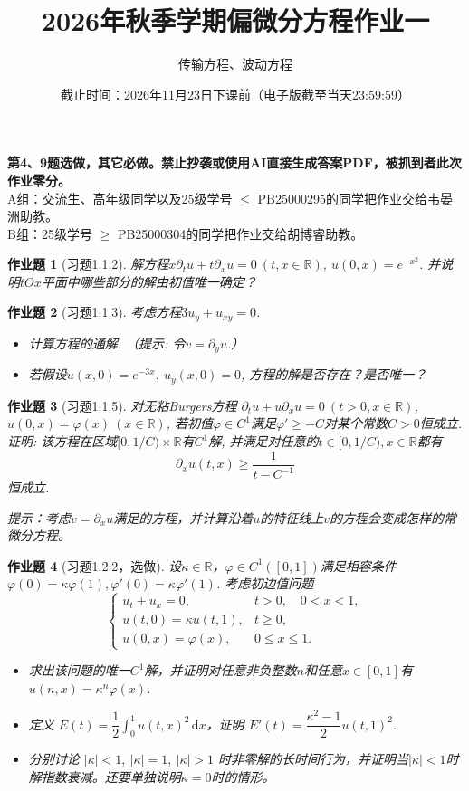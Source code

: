 \documentclass[UTF8,fontset=windows,12pt]{ctexart}
\theoremstyle{kaiti-theorem}
\newtheorem{problem}{作业题}
\numberwithin{equation}{section}
\newcommand{\R}{\mathbb{R}}
\newcommand{\vp}{\varphi}
\newcommand{\p}{\partial}
\newcommand{\dx}{\,\mathrm{d}x}
\newcommand{\kk}{\kappa}
\begin{document}
\title{\LARGE{\bf  2026年秋季学期偏微分方程作业一}}
\author{传输方程、波动方程}
\date{截止时间：2026年11月23日下课前（电子版截至当天23:59:59）}

\maketitle

\textbf{第4、9题选做，其它必做。禁止抄袭或使用AI直接生成答案PDF，被抓到者此次作业零分。}\\
A组：交流生、高年级同学以及25级学号 $\leqslant$ PB25000295的同学把作业交给韦晏洲助教。\\
B组：25级学号 $\geqslant$ PB25000304的同学把作业交给胡博睿助教。

\begin{problem}[习题1.1.2]
解方程$x\p_t u+t\p_x u=0~(t,x\in\R),~u(0,x)=e^{-x^2}$. 并说明$tOx$平面中哪些部分的解由初值唯一确定？
\end{problem}

\begin{problem}[习题1.1.3]
考虑方程$3u_y+u_{xy}=0$.
\begin{itemize}
\item [(1)] 计算方程的通解. （提示: 令$v=\p_y u$.）
\item [(2)] 若假设$u(x,0)=e^{-3x},~u_y(x,0)=0$, 方程的解是否存在？是否唯一？
\end{itemize}
\end{problem}

\begin{problem}[习题1.1.5]
对无粘Burgers方程 $\p_t u+u\p_x u=0~(t>0,x\in\R)$, $u(0,x)=\vp(x)~(x\in\R)$, 若初值$\vp\in C^1$满足$\vp'\geqslant -C$对某个常数$C>0$恒成立. 证明: 该方程在区域$[0,1/C)\times \R$有$C^1$解, 并满足对任意的$t\in[0,1/C),x\in\R$都有$$\p_x u(t,x)\geqslant \frac{1}{t-C^{-1}}$$恒成立. 

提示：考虑$v=\p_x u$满足的方程，并计算沿着$u$的特征线上$v$的方程会变成怎样的常微分方程。
\end{problem}

\begin{problem}[习题1.2.2，选做]
设$\kk\in\R$，$\vp\in C^1([0,1])$满足相容条件 $\vp(0)=\kk\vp(1),\vp'(0)=\kk\vp'(1)$. 考虑初边值问题
\[
\begin{cases}
u_t+u_x=0,&t>0,\quad 0<x<1,\\
u(t,0)=\kk u(t,1),&t\geqslant0,\\
u(0,x)=\vp(x),&0\leqslant x\leqslant1.
\end{cases}
\]
\begin{itemize}
\item[(1)] 求出该问题的唯一$C^1$解，并证明对任意非负整数$n$和任意$x\in[0,1]$有$u(n,x)=\kk^n\vp(x)$.
\item[(2)] 定义 $E(t)=\dfrac12\int_0^1u(t,x)^2\dx$，证明 $E'(t)=\dfrac{\kk^2-1}{2}u(t,1)^2.$
\item[(3)] 分别讨论 \(|\kk|<1,~|\kk|=1,~|\kk|>1\) 时非零解的长时间行为，并证明当$|\kk|<1$时解指数衰减。还要单独说明$\kk=0$时的情形。
\end{itemize}
\end{problem}
\end{document}
